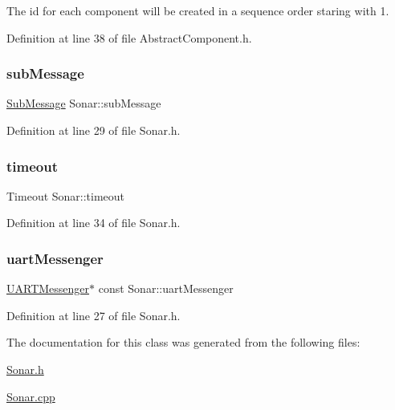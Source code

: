 The id for each component will be created in a sequence order staring with 1. 



Definition at line 38 of file Abstract\+Component.\+h.

\mbox{\label{class_sonar_a08f09f7abe342846e6e97b8dd76d623b}} 
\subsubsection{\texorpdfstring{sub\+Message}{subMessage}}
{\footnotesize\ttfamily \hyperlink{struct_sub_message}{Sub\+Message} Sonar\+::sub\+Message\hspace{0.3cm}{\ttfamily [private]}}



Definition at line 29 of file Sonar.\+h.

\mbox{\label{class_sonar_a4b3cc5317263c63dd58195f3c2c94da6}} 
\subsubsection{\texorpdfstring{timeout}{timeout}}
{\footnotesize\ttfamily Timeout Sonar\+::timeout\hspace{0.3cm}{\ttfamily [private]}}



Definition at line 34 of file Sonar.\+h.

\mbox{\label{class_sonar_a63b5d2455e9278c9d3c6dded215789f6}} 
\subsubsection{\texorpdfstring{uart\+Messenger}{uartMessenger}}
{\footnotesize\ttfamily \hyperlink{class_u_a_r_t_messenger}{U\+A\+R\+T\+Messenger}$\ast$ const Sonar\+::uart\+Messenger\hspace{0.3cm}{\ttfamily [private]}}



Definition at line 27 of file Sonar.\+h.



The documentation for this class was generated from the following files\+:\begin{DoxyCompactItemize}
\item 
\hyperlink{_sonar_8h}{Sonar.\+h}\item 
\hyperlink{_sonar_8cpp}{Sonar.\+cpp}\end{DoxyCompactItemize}
